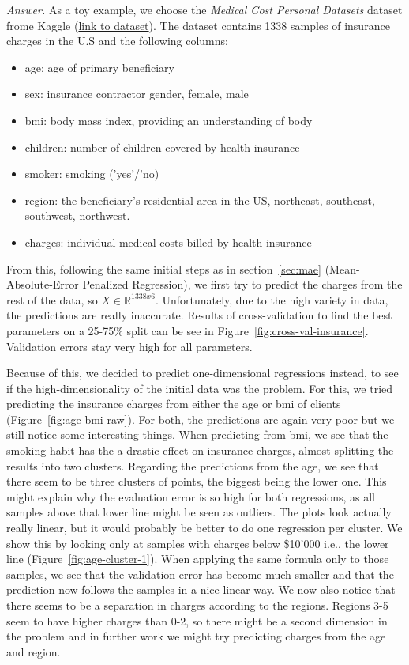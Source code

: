 \documentclass[10pt]{article}
\newenvironment{exercise}[2][Exercise]{\begin{trivlist}
  \item[\hskip \labelsep {\bfseries #1}\hskip \labelsep {\bfseries #2.}]}{\end{trivlist}}
\begin{document}
\begin{exercise}{8}
\textit{Answer.} As a toy example, we choose the \textit{Medical Cost Personal Datasets} dataset frome Kaggle (\href{https://www.kaggle.com/mirichoi0218/insurance}{link to dataset}). The dataset contains 1338 samples of insurance charges in the U.S and the following columns: 
\begin{itemize}
    \item age: age of primary beneficiary
    \item sex: insurance contractor gender, female, male
    \item bmi: body mass index, providing an understanding of body
    \item children: number of children covered by health insurance 
    \item smoker: smoking ('yes'/'no)
    \item region: the beneficiary's residential area in the US, northeast, southeast, southwest, northwest.
    \item charges: individual medical costs billed by health insurance
\end{itemize}
From this, following the same initial steps as in section~\ref{sec:mae} (Mean-Absolute-Error Penalized Regression), we first try to predict the charges from the rest of the data, so $X\in\mathbb{R}^{1338x6}$. Unfortunately, due to the high variety in data, the predictions are really inaccurate. Results of cross-validation to find the best parameters on a 25-75\% split can be see in Figure~\ref{fig:cross-val-insurance}. Validation errors stay very high for all parameters.     

Because of this, we decided to predict one-dimensional regressions instead, to see if the high-dimensionality of the initial data was the problem. For this, we tried predicting the insurance charges from either the age or bmi of clients (Figure~\ref{fig:age-bmi-raw}). For both, the predictions are again very poor but we still notice some interesting things. When predicting from bmi, we see that the smoking habit has the a drastic effect on insurance charges, almost splitting the  results into two clusters. Regarding the predictions from the age, we see that there seem to be three clusters of points, the biggest being the lower one. This might explain why the evaluation error is so high for both regressions, as all samples above that lower line might be seen as outliers. The plots look actually really linear, but it would probably be better to do one regression per cluster. We show this by looking only at samples with charges below \$10'000 i.e., the lower line (Figure~\ref{fig:age-cluster-1}). When applying the same formula only to those samples, we see that the validation error has become much smaller and that the prediction now follows the samples in a nice linear way. We now also notice that there seems to be a separation in charges according to the regions. Regions 3-5 seem to have higher charges than 0-2, so there might be a second dimension in the problem and in further work we might try predicting charges from the age and region. 


\end{exercise}
\end{document}
